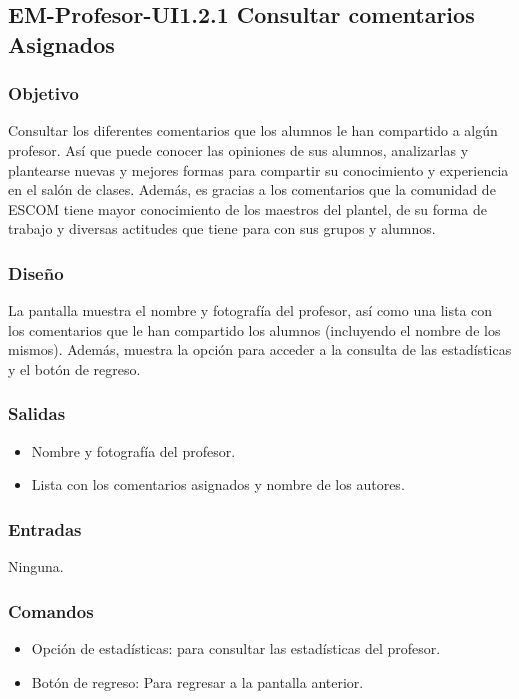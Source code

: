 
\subsection{EM-Profesor-UI1.2.1 Consultar comentarios Asignados}

\subsubsection{Objetivo}
	\noindent
	Consultar los diferentes comentarios que los alumnos le han compartido a algún profesor. Así que puede conocer las opiniones de sus alumnos, analizarlas y plantearse nuevas y mejores formas para compartir su conocimiento y experiencia en el salón de clases. Además, es gracias a los comentarios que la comunidad de ESCOM tiene mayor conocimiento de los maestros del plantel, de su forma de trabajo y diversas actitudes que tiene para con sus grupos y alumnos.

\subsubsection{Diseño}
	\noindent
	La pantalla muestra el nombre y fotografía del profesor, así como una lista con los comentarios que le han compartido los alumnos (incluyendo el nombre de los mismos).
	Además, muestra la opción para acceder a la consulta de las estadísticas y el botón de regreso.

\pagebreak
{}

\subsubsection{Salidas}
	\begin{itemize}
		\item Nombre y fotografía del profesor.
		\item Lista con los comentarios asignados y nombre de los autores.
	\end{itemize}

\subsubsection{Entradas}
	\noindent
	Ninguna.

\subsubsection{Comandos}
	\begin{itemize}
		\item Opción de estadísticas: para consultar las estadísticas del profesor.
		\item Botón de regreso: Para regresar a la pantalla anterior.
	\end{itemize}

